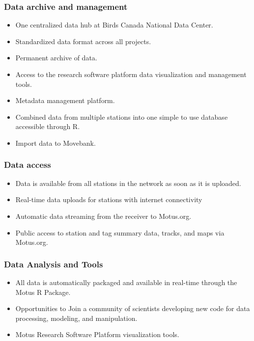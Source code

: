 \documentclass[
]{article}
\providecommand{\tightlist}{%
  \setlength{\itemsep}{0pt}\setlength{\parskip}{0pt}}
\begin{document}
\hypertarget{data-archive-and-management}{%
\subsubsection{Data archive and
management}\label{data-archive-and-management}}

\begin{itemize}
\tightlist
\item
  One centralized data hub at Birds Canada National Data Center.
\item
  Standardized data format across all projects.
\item
  Permanent archive of data.
\item
  Access to the research software platform data visualization and
  management tools.
\item
  Metadata management platform.
\item
  Combined data from multiple stations into one simple to use database
  accessible through R.
\item
  Import data to Movebank.
\end{itemize}

\hypertarget{data-access}{%
\subsubsection{Data access}\label{data-access}}

\begin{itemize}
\tightlist
\item
  Data is available from all stations in the network as soon as it is
  uploaded.
\item
  Real-time data uploads for stations with internet connectivity
\item
  Automatic data streaming from the receiver to Motus.org.
\item
  Public access to station and tag summary data, tracks, and maps via
  Motus.org.
\end{itemize}

\hypertarget{data-analysis-and-tools}{%
\subsubsection{Data Analysis and Tools}\label{data-analysis-and-tools}}

\begin{itemize}
\tightlist
\item
  All data is automatically packaged and available in real-time through
  the Motus R Package.
\item
  Opportunities to Join a community of scientists developing new code
  for data processing, modeling, and manipulation.
\item
  Motus Research Software Platform visualization tools.
\end{itemize}
\end{document}
